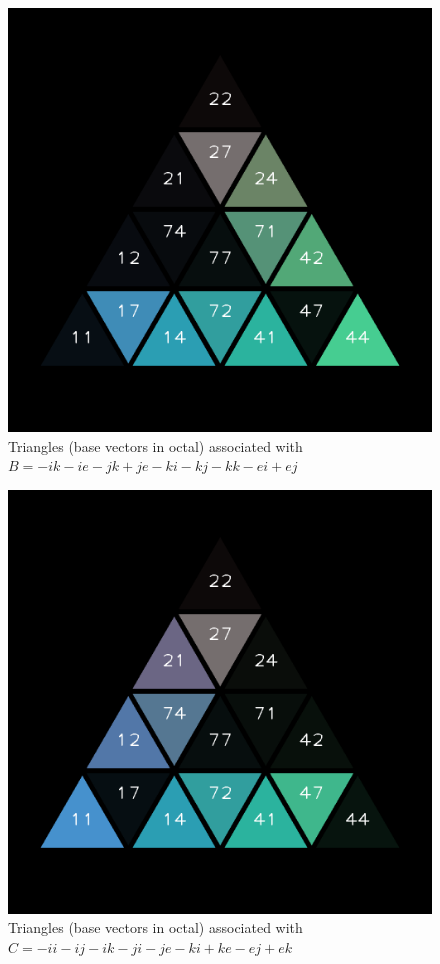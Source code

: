 \documentclass[12pt]{article}
\begin{document}
\begin{figure}[h]
  \centering
  \includegraphics[scale=0.25]{order_2A115032_floB.png}
  \caption{Triangles (base vectors in octal) associated with  $B = -ik - ie - jk + je - ki - kj - kk - ei + ej$}
\end{figure}


\begin{figure}[h]
  \centering
  \includegraphics[scale=0.25]{order_2A115032_floC.png}
  \caption{Triangles (base vectors in octal) associated with  $C = -ii - ij - ik - ji - je - ki + ke - ej + ek$}
\end{figure}
\end{document}
